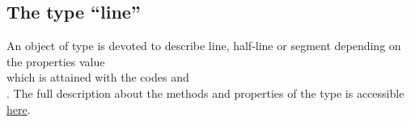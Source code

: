 \documentclass[pdftex]{article}
\begin{document}
\subsection{The type \texorpdfstring{``line''}{line}}
An object of type  is devoted  to describe  line,  half-line
or  segment depending on the properties value\hfill\\
 which is attained with the codes 
 and\hfill\\ 
.
The full description about the methods and properties of the type 
is accessible
\href{http://piprim.tuxfamily.org/asymptote/geometry/modules/geometry.asy.index.sign.html#struct\%20line}{here}.
\end{document}
